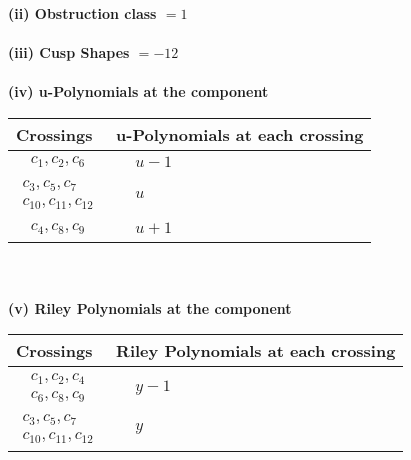 \documentclass[1p]{elsarticle_modified}
\theoremstyle{definition}
\begin{document}
\flushleft \textbf{(ii) Obstruction class $= 1$}\\~\\
\flushleft \textbf{(iii) Cusp Shapes $= -12$}\\~\\
\newpage\renewcommand{\arraystretch}{1}
\flushleft \textbf{(iv) u-Polynomials at the component}\newline \\
\begin{tabular}{m{50pt}|m{274pt}}
Crossings & \hspace{64pt}u-Polynomials at each crossing \\
\hline $$\begin{aligned}c_{1},c_{2},c_{6}\end{aligned}$$&$\begin{aligned}
&u-1
\end{aligned}$\\
\hline $$\begin{aligned}c_{3},c_{5},c_{7}\\c_{10},c_{11},c_{12}\end{aligned}$$&$\begin{aligned}
&u
\end{aligned}$\\
\hline $$\begin{aligned}c_{4},c_{8},c_{9}\end{aligned}$$&$\begin{aligned}
&u+1
\end{aligned}$\\
\hline
\end{tabular}\\~\\
\newpage\renewcommand{\arraystretch}{1}
\flushleft \textbf{(v) Riley Polynomials at the component}\newline \\
\begin{tabular}{m{50pt}|m{274pt}}
Crossings & \hspace{64pt}Riley Polynomials at each crossing \\
\hline $$\begin{aligned}c_{1},c_{2},c_{4}\\c_{6},c_{8},c_{9}\end{aligned}$$&$\begin{aligned}
&y-1
\end{aligned}$\\
\hline $$\begin{aligned}c_{3},c_{5},c_{7}\\c_{10},c_{11},c_{12}\end{aligned}$$&$\begin{aligned}
&y
\end{aligned}$\\
\hline
\end{tabular}\\~\\
\end{document}
